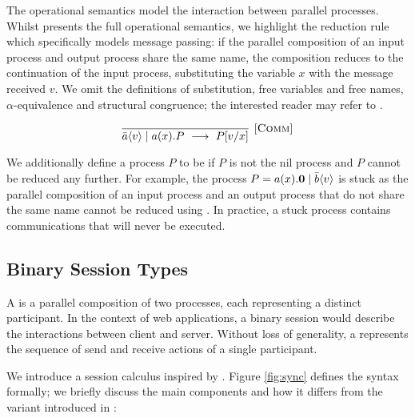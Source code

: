The operational semantics model the interaction between parallel processes. Whilst \cite{C406Lecture} presents the full operational semantics, we highlight the  reduction rule which specifically models message passing:
if the parallel composition of an input process and output process share the same name, the composition reduces to the continuation of the input process, substituting the variable $x$ with the message received $v$. We omit the definitions of substitution, free variables and free names, $\alpha$-equivalence and structural congruence; the interested reader may refer to \cite{C406Lecture}.

\[
\infer[\mbox{\rulename{Comm}}]{\piout{a}{v} \mid \piin{a}{x}.P ~\longrightarrow ~ P[v/x] }{}
\]

We additionally define a process $P$ to be  if $P$ is not the nil process and $P$ cannot be reduced any further. For example, the process $P = a(x).\mathbf{0} \mid \bar{b}\langle v \rangle$ is stuck as the parallel composition of an input process and an output process that do not share the same name cannot be reduced using . In practice, a stuck process contains communications that will never be executed.

\subsection{Binary Session Types}\label{section_bst}
A  is a parallel composition of two processes, each representing a distinct participant.
In the context of web applications, a binary session would describe the interactions between client and server.
Without loss of generality, a  represents the sequence of send and receive actions of a single participant.

We introduce a  session calculus inspired by \cite{MPST}. Figure \ref{fig:sync} defines the syntax formally; we briefly discuss the main components and how it differs from the variant introduced in \cite{C406Lecture}:

